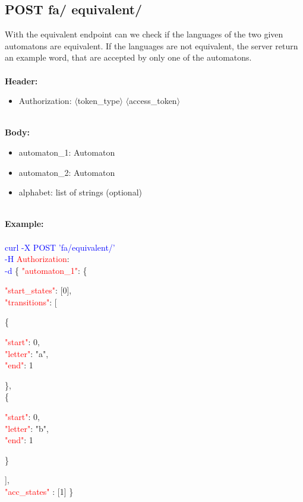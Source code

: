 \subsection{POST fa/ equivalent/}
With the equivalent endpoint can we check if the languages of the two given automatons are equivalent. If the languages are not equivalent, the server return an example word, that are accepted by only one of the automatons. \\
\ \\
\textbf{Header:}
\begin{itemize}
    \item Authorization: $\langle$token\_type$\rangle$ $\langle$access\_token$\rangle$
\end{itemize}
\ \\
\textbf{Body:}
\begin{itemize}
    \item automaton\_1: Automaton
     \item automaton\_2: Automaton
    \item alphabet: list of strings (optional)
\end{itemize}
\ \\
\textbf{Example:} \\
\ \\
\textcolor{blue}{curl -X POST '\BaseURL fa/equivalent/'\\
-H} \textcolor{red}{Authorization}: \Auth \\
\textcolor{blue}{-d} \{ 
     \textcolor{red}{"automaton\_1"}: \{
     \begin{adjustwidth}{7.5 mm}{0 cm}
     \begin{adjustwidth}{7.5 mm}{0 cm}
            \textcolor{red}{"start\_states"}: [0],\\
            \textcolor{red}{"transitions"}: [
            \begin{adjustwidth}{7.5 mm}{0 cm}
            \{
               \begin{adjustwidth}{7.5 mm}{0 cm}
                    \textcolor{red}{"start"}: 0,\\
                    \textcolor{red}{"letter"}: "a",\\
                    \textcolor{red}{"end"}: 1
               \end{adjustwidth}
            \},\\
            \{
               \begin{adjustwidth}{7.5 mm}{0 cm}
                    \textcolor{red}{"start"}: 0,\\
                    \textcolor{red}{"letter"}: "b",\\
                    \textcolor{red}{"end"}: 1
               \end{adjustwidth}
            \}
            \end{adjustwidth}
            ],\\
        \textcolor{red}{"acc\_states" }: [1]  \}
    \end{adjustwidth}
    \end{adjustwidth}
